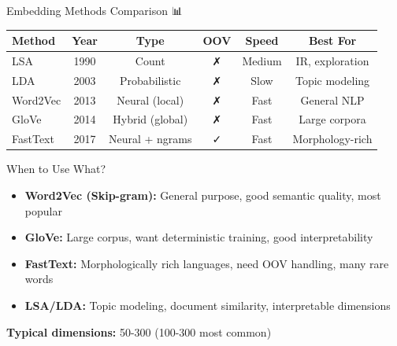 \documentclass[aspectratio=169]{beamer}
\begin{document}
\begin{frame}{Embedding Methods Comparison 📊}
\begin{center}
\small
\begin{tabular}{lccccc}
\toprule
\textbf{Method} & \textbf{Year} & \textbf{Type} & \textbf{OOV} & \textbf{Speed} & \textbf{Best For} \\
\midrule
LSA & 1990 & Count & ✗ & Medium & IR, exploration \\
LDA & 2003 & Probabilistic & ✗ & Slow & Topic modeling \\
Word2Vec & 2013 & Neural (local) & ✗ & Fast & General NLP \\
GloVe & 2014 & Hybrid (global) & ✗ & Fast & Large corpora \\
FastText & 2017 & Neural + ngrams & ✓ & Fast & Morphology-rich \\
\bottomrule
\end{tabular}
\end{center}

\vspace{1em}

\begin{block}{When to Use What?}
\begin{itemize}\setlength{\itemsep}{0pt}
    \item \textbf{Word2Vec (Skip-gram):} General purpose, good semantic quality, most popular
    \item \textbf{GloVe:} Large corpus, want deterministic training, good interpretability
    \item \textbf{FastText:} Morphologically rich languages, need OOV handling, many rare words
    \item \textbf{LSA/LDA:} Topic modeling, document similarity, interpretable dimensions
\end{itemize}
\end{block}

\vspace{0.5em}
\textbf{Typical dimensions:} 50-300 (100-300 most common)
\end{frame}
\end{document}
